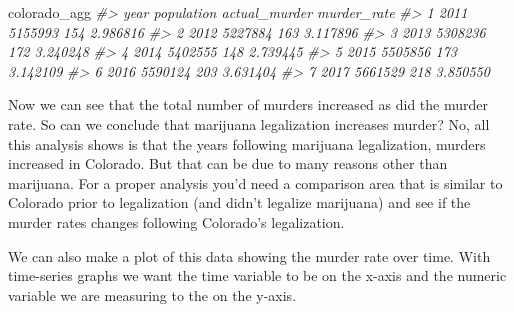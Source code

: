 \documentclass[
  12pt,
  openany]{book}
\newenvironment{Shaded}{\begin{snugshade}}{\end{snugshade}}
\newcommand{\AttributeTok}[1]{\textcolor[rgb]{0.61,0.61,0.61}{#1}}
\newcommand{\CommentTok}[1]{\textcolor[rgb]{0.37,0.37,0.37}{\textit{#1}}}
\newcommand{\DecValTok}[1]{\textcolor[rgb]{0.06,0.06,0.06}{#1}}
\newcommand{\FunctionTok}[1]{\textcolor[rgb]{0,0,0}{#1}}
\newcommand{\NormalTok}[1]{#1}
\newcommand{\OtherTok}[1]{\textcolor[rgb]{0.37,0.37,0.37}{#1}}
\newcommand{\SpecialCharTok}[1]{\textcolor[rgb]{0,0,0}{#1}}
\begin{document}
\begin{Shaded}
\end{Shaded}

\begin{Shaded}
\begin{Highlighting}[]
\NormalTok{colorado\_agg}
\CommentTok{\#\textgreater{}   year population actual\_murder murder\_rate}
\CommentTok{\#\textgreater{} 1 2011    5155993           154    2.986816}
\CommentTok{\#\textgreater{} 2 2012    5227884           163    3.117896}
\CommentTok{\#\textgreater{} 3 2013    5308236           172    3.240248}
\CommentTok{\#\textgreater{} 4 2014    5402555           148    2.739445}
\CommentTok{\#\textgreater{} 5 2015    5505856           173    3.142109}
\CommentTok{\#\textgreater{} 6 2016    5590124           203    3.631404}
\CommentTok{\#\textgreater{} 7 2017    5661529           218    3.850550}
\end{Highlighting}
\end{Shaded}

Now we can see that the total number of murders increased as did the murder rate. So can we conclude that marijuana legalization increases murder? No, all this analysis shows is that the years following marijuana legalization, murders increased in Colorado. But that can be due to many reasons other than marijuana. For a proper analysis you'd need a comparison area that is similar to Colorado prior to legalization (and didn't legalize marijuana) and see if the murder rates changes following Colorado's legalization.

We can also make a plot of this data showing the murder rate over time. With time-series graphs we want the time variable to be on the x-axis and the numeric variable we are measuring to the on the y-axis.

\begin{Shaded}
\end{Shaded}
\end{document}

